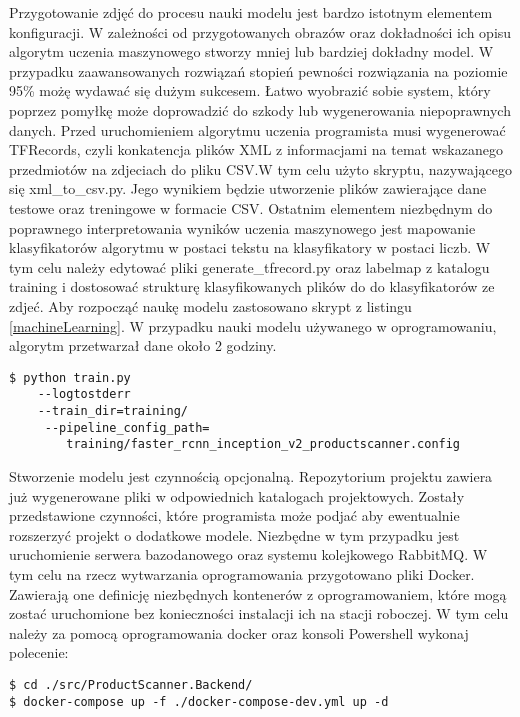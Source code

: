 Przygotowanie zdjęć do procesu nauki modelu jest bardzo istotnym elementem konfiguracji. W zależności od przygotowanych obrazów oraz dokładności ich opisu algorytm uczenia maszynowego stworzy mniej lub bardziej dokładny model. W przypadku zaawansowanych rozwiązań stopień pewności rozwiązania na poziomie 95\% możę wydawać się dużym sukcesem. Łatwo wyobrazić sobie system, który poprzez pomyłkę może doprowadzić do szkody lub wygenerowania niepoprawnych danych. Przed uruchomieniem algorytmu uczenia programista musi wygenerować TFRecords, czyli konkatencja plików XML z informacjami na temat wskazanego przedmiotów na zdjeciach do pliku CSV.W tym celu użyto skryptu, nazywającego się xml\_to\_csv.py. Jego wynikiem będzie utworzenie plików zawierające dane testowe oraz treningowe w formacie CSV. Ostatnim elementem niezbędnym do poprawnego interpretowania wyników uczenia maszynowego jest mapowanie klasyfikatorów algorytmu w postaci tekstu na klasyfikatory w postaci liczb. W tym celu należy edytować pliki generate\_tfrecord.py oraz labelmap z katalogu training i dostosować strukturę klasyfikowanych plików do do klasyfikatorów ze zdjeć. Aby rozpocząć naukę modelu zastosowano skrypt z listingu \ref{machineLearning}. W przypadku nauki modelu używanego w oprogramowaniu, algorytm przetwarzał dane około 2 godziny. 

\begin{lstlisting}[caption={Uruchomienie algorytmu uczenia maszynowego.}, label={machineLearning} ]
$ python train.py 
	--logtostderr 
	--train_dir=training/
	 --pipeline_config_path=
	 	training/faster_rcnn_inception_v2_productscanner.config
\end{lstlisting}


Stworzenie modelu jest czynnością opcjonalną. Repozytorium projektu zawiera już wygenerowane pliki w odpowiednich katalogach projektowych. Zostały przedstawione czynności, które programista może podjać aby ewentualnie rozszerzyć projekt o dodatkowe modele. Niezbędne w tym przypadku jest uruchomienie serwera bazodanowego oraz systemu kolejkowego RabbitMQ. W tym celu na rzecz wytwarzania oprogramowania przygotowano pliki Docker. Zawierają one definicję niezbędnych kontenerów z oprogramowaniem, które mogą zostać uruchomione bez konieczności instalacji ich na stacji roboczej. W tym celu należy za pomocą oprogramowania docker oraz konsoli Powershell wykonaj polecenie:

\begin{lstlisting}[caption={Uruchomienie kontenerów docker.} ]
$ cd ./src/ProductScanner.Backend/
$ docker-compose up -f ./docker-compose-dev.yml up -d
\end{lstlisting}

